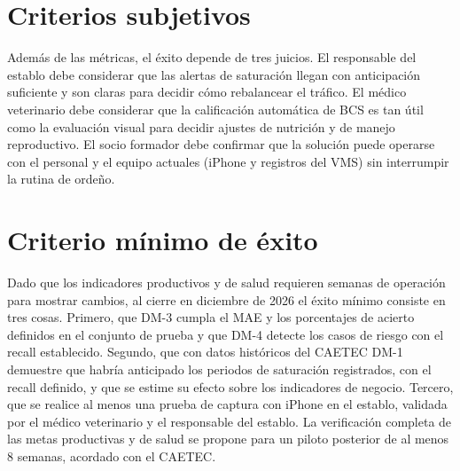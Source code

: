\documentclass[11pt,letterpaper,DIV=12]{scrartcl}
\begin{document}
\section{Criterios subjetivos}

Además de las métricas, el éxito depende de tres juicios. El responsable del establo debe considerar que las alertas de saturación llegan con anticipación suficiente y son claras para decidir cómo rebalancear el tráfico. El médico veterinario debe considerar que la calificación automática de BCS es tan útil como la evaluación visual para decidir ajustes de nutrición y de manejo reproductivo. El socio formador debe confirmar que la solución puede operarse con el personal y el equipo actuales (iPhone y registros del VMS) sin interrumpir la rutina de ordeño.

\section{Criterio mínimo de éxito}

Dado que los indicadores productivos y de salud requieren semanas de operación para mostrar cambios, al cierre en diciembre de 2026 el éxito mínimo consiste en tres cosas. Primero, que DM-3 cumpla el MAE y los porcentajes de acierto definidos en el conjunto de prueba y que DM-4 detecte los casos de riesgo con el recall establecido. Segundo, que con datos históricos del CAETEC DM-1 demuestre que habría anticipado los periodos de saturación registrados, con el recall definido, y que se estime su efecto sobre los indicadores de negocio. Tercero, que se realice al menos una prueba de captura con iPhone en el establo, validada por el médico veterinario y el responsable del establo. La verificación completa de las metas productivas y de salud se propone para un piloto posterior de al menos 8 semanas, acordado con el CAETEC.

\printbibliography
\end{document}
